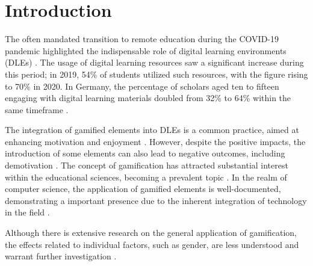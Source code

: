 \section{Introduction}

The often mandated transition to remote education during the COVID-19 pandemic highlighted the indispensable role of digital learning environments (DLEs) \parencite{garcia-moralesTransformationHigherEducation2021}.
The usage of digital learning resources saw a significant increase during this period; in 2019, 54\% of students utilized such resources, with the figure rising to 70\% in 2020.
In Germany, the percentage of scholars aged ten to fifteen engaging with digital learning materials doubled from 32\% to 64\% within the same timeframe \parencite{pressestelledesstatistischenbundesamtsDigitalesLernenNimmt2020}.

The integration of gamified elements into DLEs is a common practice, aimed at enhancing motivation and enjoyment \parencite{gonzalezGamificationIntelligentTutoring2014, jacksonMotivationPerformanceGamebased2013}.
However, despite the positive impacts, the introduction of some elements can also lead to negative outcomes, including demotivation \parencite{almeidaSystematicMappingNegative2021}.
The concept of gamification has attracted substantial interest within the educational sciences, becoming a prevalent topic \parencite{swachaStateResearchGamification2021}.
In the realm of computer science, the application of gamified elements is well-documented, demonstrating a important presence due to the inherent integration of technology in the field \parencite{dichevGamifyingEducationWhat2017}.

Although there is extensive research on the general application of gamification, the effects related to individual factors, such as gender, are less understood and warrant further investigation \parencite{dehghanzadehUsingGamificationSupport2024, oliveiraTailoredGamificationEducation2023}.


